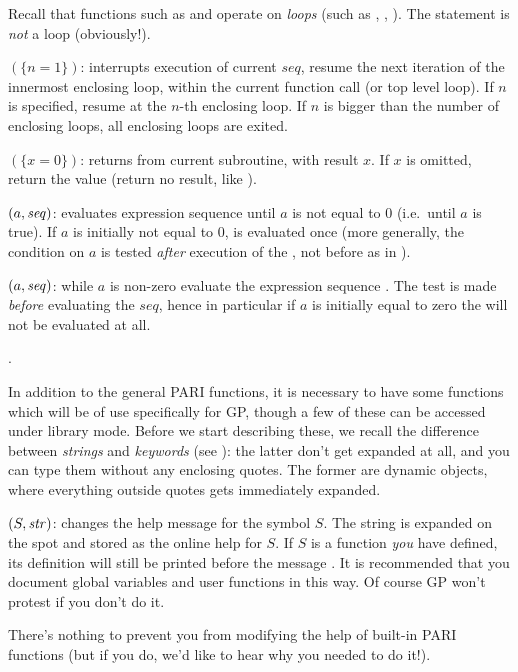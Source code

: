   Recall that functions such as  and  operate on
\emph{loops} (such as , , ). The 
statement is \emph{not} a loop (obviously!).

$(\{n=1\})$: interrupts execution of current $seq$,
resume the next iteration of the innermost enclosing loop, within the
current function call (or top level loop). If $n$ is specified, resume at
the $n$-th enclosing loop. If $n$ is bigger than the number of enclosing
loops, all enclosing loops are exited.

$(\{x=0\})$: returns from current subroutine, with
result $x$. If $x$ is omitted, return the  value (return no
result, like ).

$(a,\hbox{\it seq\/})$: evaluates expression sequence 
until $a$ is not equal to 0 (i.e.~until $a$ is true). If $a$ is initially
not equal to 0,  is evaluated once (more generally, the condition
on $a$ is tested \emph{after} execution of the , not before as in
).

$(a,\hbox{\it seq\/})$: while $a$ is non-zero evaluate the
expression sequence . The test is made \emph{before} evaluating
the $seq$, hence in particular if $a$ is initially equal to zero the
 will not be evaluated at all.\smallskip

.
\label{se:gp_program}

  In addition to the general PARI functions, it is necessary to have some
functions which will be of use specifically for GP, though a few of these can
be accessed under library mode. Before we start describing these, we recall
the difference between \emph{strings} and \emph{keywords} (see
): the latter don't get expanded at all, and you can type
them without any enclosing quotes. The former are dynamic objects, where
everything outside quotes gets immediately expanded.

$(S,\hbox{\it str\/})$:\label{se:addhelp} changes the help
message for the symbol $S$. The string  is expanded on the spot
and stored as the online help for $S$. If $S$ is a function \emph{you} have
defined, its definition will still be printed before the message .
It is recommended that you document global variables and user functions in
this way. Of course GP won't protest if you don't do it.

There's nothing to prevent you from modifying the help of built-in PARI
functions (but if you do, we'd like to hear why you needed to do it!).

